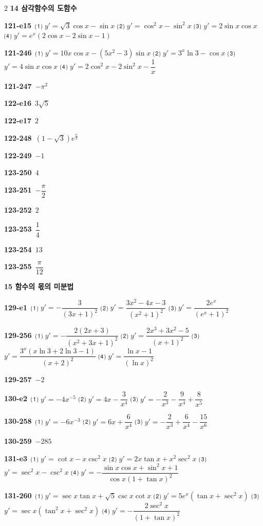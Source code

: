 \documentclass[10pt,a4paper]{article}
\begin{document}
\begin{multicols}{2}
\noindent\textbf{14 삼각함수의 도함수}\par\smallskip
\noindent\textbf{121-e15}\ ⑴ $y'=\sqrt{3}\cos x-\sin x$ ⑵ $y'=\cos^2 x-\sin^2 x$ ⑶ $y'=2\sin x\cos x$ ⑷ $y'=e^x(2\cos x-2\sin x-1)$\par
\noindent\textbf{121-246}\ ⑴ $y'=10x\cos x-(5x^2-3)\sin x$ ⑵ $y'=3^x\ln 3-\cos x$ ⑶ $y'=4\sin x\cos x$ ⑷ $y'=2\cos^2 x-2\sin^2 x-\dfrac{1}{x}$\par
\noindent\textbf{121-247}\ $-\pi^2$\par
\noindent\textbf{122-e16}\ $3\sqrt{5}$\par
\noindent\textbf{122-e17}\ $2$\par
\noindent\textbf{122-248}\ $(1-\sqrt{3})e^{\frac{\pi}{3}}$\par
\noindent\textbf{122-249}\ $-1$\par
\noindent\textbf{123-250}\ $4$\par
\noindent\textbf{123-251}\ $-\dfrac{\pi}{2}$\par
\noindent\textbf{123-252}\ $2$\par
\noindent\textbf{123-253}\ $\dfrac{1}{4}$\par
\noindent\textbf{123-254}\ $13$\par
\noindent\textbf{123-255}\ $\dfrac{\pi}{12}$\par
\noindent\textbf{15 함수의 몫의 미분법}\par\smallskip
\noindent\textbf{129-e1}\ ⑴ $y'=-\dfrac{3}{(3x+1)^2}$ ⑵ $y'=\dfrac{3x^2-4x-3}{(x^2+1)^2}$ ⑶ $y'=\dfrac{2e^x}{(e^x+1)^2}$\par
\noindent\textbf{129-256}\ ⑴ $y'=-\dfrac{2(2x+3)}{(x^2+3x+1)^2}$ ⑵ $y'=\dfrac{2x^3+3x^2-5}{(x+1)^2}$ ⑶ $y'=\dfrac{3^x(x\ln 3+2\ln 3-1)}{(x+2)^2}$ ⑷ $y'=\dfrac{\ln x-1}{(\ln x)^2}$\par
\noindent\textbf{129-257}\ $-2$\par
\noindent\textbf{130-e2}\ ⑴ $y'=-4x^{-5}$ ⑵ $y'=4x-\dfrac{3}{x^4}$ ⑶ $y'=-\dfrac{2}{x^3}-\dfrac{9}{x^4}+\dfrac{8}{x^5}$\par
\noindent\textbf{130-258}\ ⑴ $y'=-6x^{-3}$ ⑵ $y'=6x+\dfrac{6}{x^4}$ ⑶ $y'=-\dfrac{2}{x^3}+\dfrac{6}{x^4}-\dfrac{15}{x^6}$\par
\noindent\textbf{130-259}\ $-285$\par
\noindent\textbf{131-e3}\ ⑴ $y'=\cot x-x\csc^2 x$ ⑵ $y'=2x\tan x+x^2\sec^2 x$ ⑶ $y'=\sec^2 x-\csc^2 x$ ⑷ $y'=-\dfrac{\sin x\cos x+\sin^2 x+1}{\cos x(1+\tan x)^2}$\par
\noindent\textbf{131-260}\ ⑴ $y'=\sec x\tan x+\sqrt{5}\csc x\cot x$ ⑵ $y'=5e^x(\tan x+\sec^2 x)$ ⑶ $y'=\sec x(\tan^2 x+\sec^2 x)$ ⑷ $y'=-\dfrac{2\sec^2 x}{(1+\tan x)^2}$\par

\end{multicols}
\end{document}
